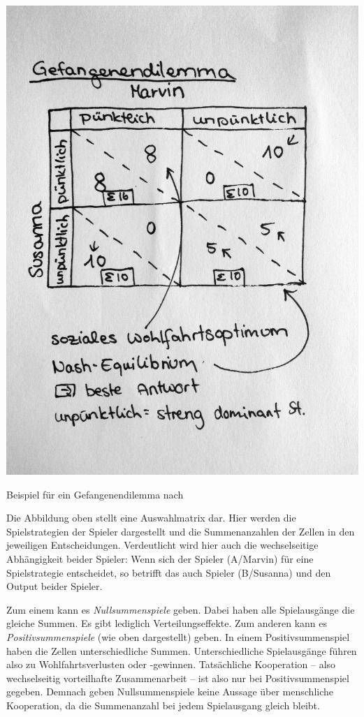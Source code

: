 \begin{dsafigure}
	\begin{center}
	\includegraphics[width=0.9\columnwidth]{img/gefangendilemma.jpg}
	\caption{Beispiel für ein Gefangenendilemma nach \cite{Kleinberg-2009-oz}}
	\label{fig:gefangenendilemma}
	\end{center}
\end{dsafigure}

Die Abbildung oben stellt eine Auswahlmatrix dar.
Hier werden die Spielstrategien der Spieler dargestellt und die Summenanzahlen der Zellen in den jeweiligen Entscheidungen.
Verdeutlicht wird hier auch die wechselseitige Abhängigkeit beider Spieler: Wenn sich der Spieler (A/Marvin) für eine Spielstrategie entscheidet, so betrifft das auch Spieler (B/Susanna) und den Output beider Spieler.

Zum einem kann es \emph{Nullsummenspiele} geben.
Dabei haben alle Spielausgänge die gleiche Summen.
Es gibt lediglich Verteilungseffekte.
Zum anderen kann es \emph{Positivsummenspiele} (wie oben dargestellt) geben.
In einem Positivsummenspiel haben die Zellen unterschiedliche Summen. Unterschiedliche Spielausgänge führen also zu Wohlfahrtsverlusten oder -gewinnen.
Tatsächliche Kooperation -- also wechselseitig vorteilhafte Zusammenarbeit -- ist also nur bei Positivsummenspiel gegeben.
Demnach geben Nullsummenspiele keine Aussage über menschliche Kooperation, da die Summenanzahl bei jedem Spielausgang gleich bleibt.

